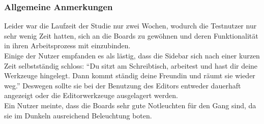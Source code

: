 




\subsubsection{Allgemeine Anmerkungen}\label{Allgemeine Anmerkungen}
Leider war die Laufzeit der Studie nur zwei Wochen, wodurch die Testnutzer nur sehr wenig Zeit hatten, sich an die Boards zu gewöhnen und deren Funktionalität in ihren Arbeitsprozess mit einzubinden.
\\
Einige der Nutzer empfanden es als lästig, dass die Sidebar sich nach einer kurzen Zeit selbstständig schloss:
``Du sitzt am Schreibtisch, arbeitest und hast dir deine Werkzeuge hingelegt. Dann kommt ständig deine Freundin und räumt sie wieder weg.''
Deswegen sollte sie bei der Benutzung des Editors entweder dauerhaft angezeigt oder die Editorwerkzeuge ausgelagert werden.
\\
Ein Nutzer meinte, dass die Boards sehr gute Notleuchten für den Gang sind, da sie im Dunkeln ausreichend Beleuchtung boten.


